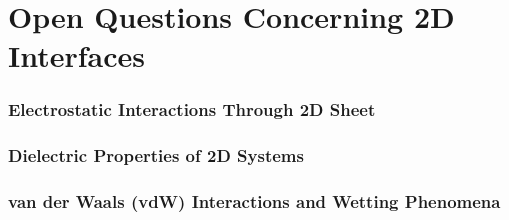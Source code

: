 \section{Open Questions  Concerning 2D Interfaces}
\label{sec:chall-probl-conc}

\subsubsection{Electrostatic Interactions Through 2D Sheet}
\label{sec:electr-inter-thro}

\subsubsection{Dielectric Properties of 2D Systems}
\label{sec:diel-prop-2d}

\subsubsection{van der Waals (vdW) Interactions and Wetting Phenomena}
\label{sec:van-der-waals}



